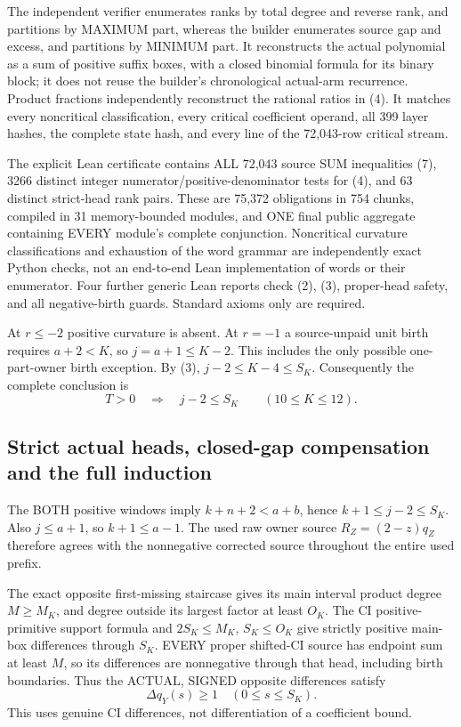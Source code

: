 \documentclass[11pt]{article}
\begin{document}
The independent verifier enumerates ranks by total degree and reverse
rank, and partitions by MAXIMUM part, whereas the builder enumerates
source gap and excess, and partitions by MINIMUM part. It reconstructs
the actual polynomial as a sum of positive suffix boxes, with a closed
binomial formula for its binary block; it does not reuse the builder's
chronological actual-arm recurrence. Product fractions independently
reconstruct the rational ratios in (4). It matches every noncritical
classification, every critical coefficient operand, all 399 layer hashes,
the complete state hash, and every line of the 72,043-row critical stream.

The explicit Lean certificate contains ALL 72,043 source SUM inequalities
(7), 3266 distinct integer numerator/positive-denominator tests for (4),
and 63 distinct strict-head rank pairs. These are 75,372 obligations in
754 chunks, compiled in 31 memory-bounded modules, and ONE final public
aggregate containing EVERY module's complete conjunction. Noncritical curvature classifications
and exhaustion of the word grammar are independently exact Python checks,
not an end-to-end Lean implementation of words or their enumerator.
Four further generic Lean reports check (2), (3), proper-head safety,
and all negative-birth guards. Standard axioms only are required.

At $r\le-2$ positive curvature is absent. At $r=-1$ a source-unpaid
unit birth requires $a+2<K$, so $j=a+1\le K-2$. This includes the
only possible one-part-owner birth exception. By (3),
$j-2\le K-4\le S_K$. Consequently the complete conclusion is
\[
 T>0\quad\Longrightarrow\quad j-2\le S_K
          \qquad(10\le K\le12).                       \tag{8}
\]

\subsection{Strict actual heads, closed-gap compensation and the full induction}
The BOTH positive windows imply $k+n+2<a+b$, hence
$k+1\le j-2\le S_K$. Also $j\le a+1$, so $k+1\le a-1$.
The used raw owner source $R_Z=(2-z)q_Z$ therefore agrees with the
nonnegative corrected source throughout the entire used prefix.

The exact opposite first-missing staircase gives its main interval product
degree $M\ge M_K$, and degree outside its largest factor at least $O_K$.
The CI positive-primitive support formula and $2S_K\le M_K$,
$S_K\le O_K$ give strictly positive main-box differences through $S_K$.
EVERY proper shifted-CI source has endpoint sum at least $M$, so its
differences are nonnegative through that head, including birth boundaries.
Thus the ACTUAL, SIGNED opposite differences satisfy
\[
                       \Delta q_Y(s)\ge1\quad(0\le s\le S_K).   \tag{9}
\]
This uses genuine CI differences, not differentiation of a coefficient bound.
\end{document}
